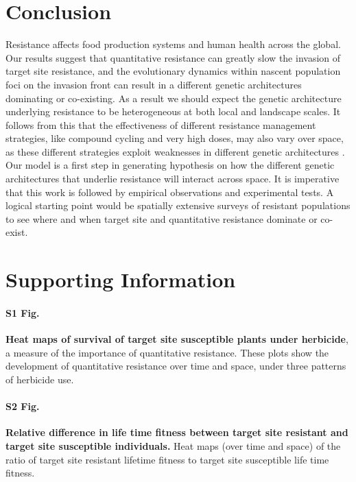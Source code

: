 \documentclass[10pt,letterpaper]{article}
\begin{document}
\section*{Conclusion}
Resistance affects food production systems and human health across the global. Our results suggest that quantitative resistance can greatly slow the invasion of target site resistance, and the evolutionary dynamics within nascent population foci on the invasion front can result in a different genetic architectures dominating or co-existing. As a result we should expect the genetic architecture underlying resistance to be heterogeneous at both local and landscape scales. It follows from this that the effectiveness of different resistance management strategies, like compound cycling and very high doses, may also vary over space, as these different strategies exploit weaknesses in different genetic architectures \cite{Rex2013}. Our model is a first step in generating hypothesis on how the different genetic architectures that underlie resistance will interact across space. It is imperative that this work is followed by empirical observations and experimental tests. A logical starting point would be spatially extensive surveys of resistant populations to see where and when target site and quantitative resistance dominate or co-exist.

\section*{Supporting Information}

\paragraph*{S1 Fig.}
\label{S1_Fig}
{\bf Heat maps of survival of target site susceptible plants under herbicide}, a measure of the importance of quantitative resistance. These plots show the development of quantitative resistance over time and space, under three patterns of herbicide use.

\paragraph*{S2 Fig.}
\label{S2_Fig}
{\bf Relative difference in life time fitness between target site resistant and target site susceptible individuals.} Heat maps (over time and space) of the ratio of target site resistant lifetime fitness to target site susceptible life time fitness. 
\end{document}

